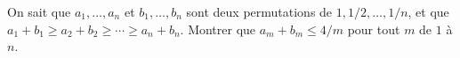 On sait que $a_1, \ldots, a_n$ et $b_1, \ldots, b_n$ sont deux permutations de $1, 1/2, \ldots, 1/n$, et que $a_1 + b_1 \geq a_2 + b_2 \geq \cdots \geq a_n + b_n$. Montrer que $a_m + b_m \leq 4/m$ pour tout $m$ de $1$ à $n$.
